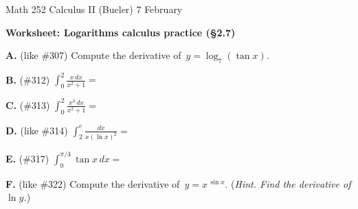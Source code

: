 \documentclass[11pt]{amsart}
\newcommand{\prob}[1]{\bigskip\noindent\textbf{#1.}\quad }
\newcommand{\ds}{\displaystyle}
\begin{document}
\scriptsize \noindent Math 252 Calculus II (Bueler) \hfill 7 February 
\normalsize\medskip

\Large\centerline{\textbf{Worksheet: Logarithms calculus practice (\S 2.7)}}
\normalsize

\thispagestyle{empty}
\bigskip

\prob{A}  (like \#307) \quad Compute the derivative of \,{\large $y=\log_{7} (\tan x)$}.
\vfill

\prob{B}  (\#312) \quad $\ds \int_0^2 \frac{x\,dx}{x^2+1} =$
\vfill

\prob{C}  (\#313) \quad $\ds \int_0^2 \frac{x^3\,dx}{x^2+1} =$
\vfill

\prob{D}  (like \#314) \quad $\ds \int_2^e \frac{dx}{x (\ln x)^2} =$
\vfill

\prob{E}  (\#317) \quad $\ds \int_0^{\pi/4} \tan x\,dx =$
\vfill

\prob{F}  (like \#322) \quad Compute the derivative of \,{\large $y=x^{\,\sin x}$}.  (\emph{Hint.  Find the derivative of $\ln y$.})
\vfill
\end{document}
